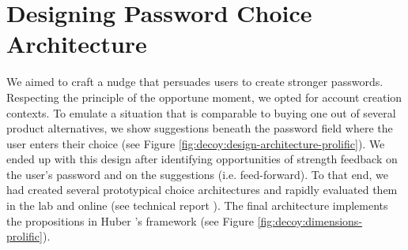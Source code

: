 \section{Designing Password Choice Architecture}
We aimed to craft a nudge that persuades users to create stronger passwords. Respecting the principle of the opportune moment, we opted for account creation contexts. To emulate a situation that is comparable to buying one out of several product alternatives, we show suggestions beneath the password field where the user enters their choice (see Figure \ref{fig:decoy:design-architecture-prolific}). We ended up with this design after identifying opportunities of strength feedback on the user's password and on the suggestions (i.e. feed-forward). To that end, we had created several prototypical choice architectures and rapidly evaluated them in the lab and online (see technical report \cite{Seitz2016DecoyEffectReport}). The final architecture implements the propositions in Huber \etal's framework (see Figure \ref{fig:decoy:dimensions-prolific}).

